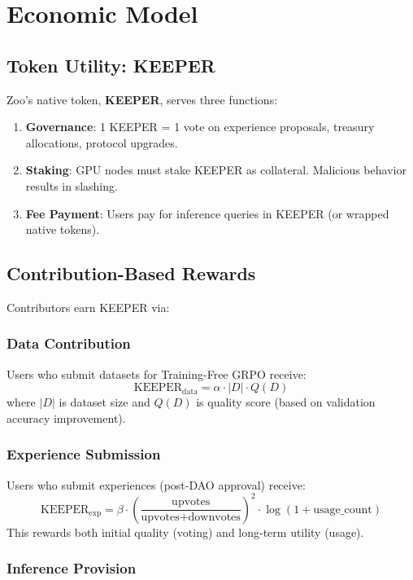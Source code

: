 \section{Economic Model}


\subsection{Token Utility: KEEPER}

Zoo's native token, \textbf{KEEPER}, serves three functions:

\begin{enumerate}
\item \textbf{Governance}: 1 KEEPER = 1 vote on experience proposals, treasury allocations, protocol upgrades.
\item \textbf{Staking}: GPU nodes must stake KEEPER as collateral. Malicious behavior results in slashing.
\item \textbf{Fee Payment}: Users pay for inference queries in KEEPER (or wrapped native tokens).
\end{enumerate}

\subsection{Contribution-Based Rewards}

Contributors earn KEEPER via:

\subsubsection{Data Contribution}

Users who submit datasets for Training-Free GRPO receive:
\[
\text{KEEPER}_{\text{data}} = \alpha \cdot |D| \cdot Q(D)
\]
where $|D|$ is dataset size and $Q(D)$ is quality score (based on validation accuracy improvement).

\subsubsection{Experience Submission}

Users who submit experiences (post-DAO approval) receive:
\[
\text{KEEPER}_{\text{exp}} = \beta \cdot \left(\frac{\text{upvotes}}{\text{upvotes} + \text{downvotes}}\right)^2 \cdot \log(1 + \text{usage\_count})
\]
This rewards both initial quality (voting) and long-term utility (usage).

\subsubsection{Inference Provision}

